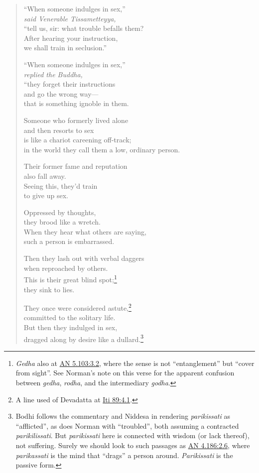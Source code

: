 \documentclass[12pt,openany]{book}%
\newcommand*{\scspeaker}[1]{\hspace{2em}\textit{#1}}
\begin{document}
\begin{verse}%
“When someone indulges in sex,” \\
\scspeaker{said Venerable Tissametteyya, }\\
“tell us, sir: what trouble befalls them? \\
After hearing your instruction, \\
we shall train in seclusion.” 

“When someone indulges in sex,” \\
\scspeaker{replied the Buddha, }\\
“they forget their instructions \\
and go the wrong way—\\
that is something ignoble in them. 

Someone who formerly lived alone \\
and then resorts to sex \\
is like a chariot careening off-track; \\
in the world they call them a low, ordinary person. 

Their former fame and reputation \\
also fall away. \\
Seeing this, they’d train \\
to give up sex. 

Oppressed by thoughts, \\
they brood like a wretch. \\
When they hear what others are saying, \\
such a person is embarrassed. 

Then they lash out with verbal daggers \\
when reproached by others. \\
This is their great blind spot;\footnote{\textit{Gedha} also at \href{https://suttacentral.net/an5.103/en/sujato\#3.2}{AN 5.103:3.2}, where the sense is not “entanglement” but “cover from sight”. See Norman’s note on this verse for the apparent confusion between \textit{gedha}, \textit{rodha}, and the intermediary \textit{godha}. } \\
they sink to lies. 

They once were considered astute,\footnote{A line used of Devadatta at \href{https://suttacentral.net/iti89/en/sujato\#4.1}{Iti 89:4.1}. } \\
committed to the solitary life. \\
But then they indulged in sex, \\
dragged along by desire like a dullard.\footnote{Bodhi follows the commentary and Niddesa in rendering \textit{parikissati} as “afflicted”, as does Norman with “troubled”, both assuming a contracted \textit{parikilissati}. But \textit{parikissati} here is connected with wisdom (or lack thereof), not suffering. Surely we should look to such passages as \href{https://suttacentral.net/an4.186/en/sujato\#2.6}{AN 4.186:2.6}, where \textit{parikassati} is the mind that “drags” a person around. \textit{Parikissati} is the passive form. } 


\end{verse}
\end{document}
